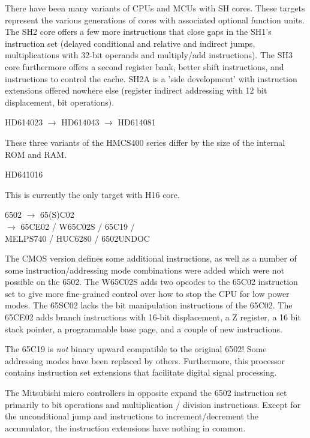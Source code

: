 \documentclass[12pt,twoside]{report}
\begin{document}
There have been many variants of CPUs and MCUs with SH cores.  These
targets represent the various generations of cores with associated
optional function units.  The SH2 core offers a few more instructions that
close gaps in the SH1's instruction set (delayed conditional and
relative and indirect jumps, multiplications with 32-bit operands and
multiply/add instructions).  The SH3 core furthermore offers a second
register bank, better shift instructions, and instructions to control
the cache.  SH2A is a 'side development' with instruction extensions
offered nowhere else (register indirect addressing with 12 bit displacement,
bit operations).
\begin{cpulist}
   HD614023 $\longrightarrow$ HD614043 $\longrightarrow$ HD614081
\end{cpulist}
These three variants of the HMCS400 series differ by the size of
the internal ROM and RAM.
\begin{cpulist}
   HD641016
\end{cpulist}
This is currently the only target with H16 core.
\begin{cpulist}
   6502 $\rightarrow$ 65(S)C02 \\
\> $\rightarrow$ 65CE02 / W65C02S / 65C19 /\\
\> MELPS740 / HUC6280 / 6502UNDOC
\end{cpulist}
The CMOS version defines some additional instructions, as well as a number of
some instruction/addressing mode combinations were added which were not
possible on the 6502.  The W65C02S adds two opcodes to the 65C02 instruction
set to give more fine-grained control over how to stop the CPU for low power
modes.  The 65SC02 lacks the bit manipulation instructions of the
65C02.  The 65CE02 adds branch instructions with 16-bit displacement, a Z
register, a 16 bit stack pointer, a programmable base page, and a couple of
new instructions.

The 65C19 is {\em not} binary upward compatible to the original
6502! Some addressing modes have been replaced by others.
Furthermore, this processor contains instruction set extensions
that facilitate digital signal processing.

The Mitsubishi micro controllers in opposite expand
the 6502 instruction set primarily to bit operations and multiplication /
division instructions.  Except for the unconditional jump and instructions
to increment/decrement the accumulator, the instruction extensions
have nothing in common.
\end{document}
